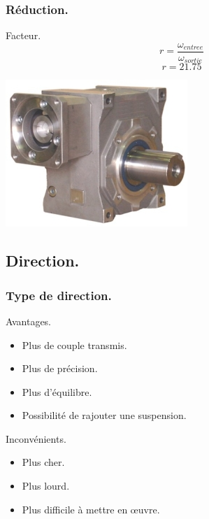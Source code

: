 \begin{frame}
    \frametitle{Réduction.}
    \begin{block}{Facteur.}
        \[ r = \frac{\omega_{entree}}{\omega_{sortie}} \]
        \[ r = 21.75 \]
    \end{block}
    \begin{center}
        \includegraphics[scale=0.9]{rcs/redu.png}
    \end{center}
\end{frame}

\subsection{Direction.}
\begin{frame}
    \frametitle{Type de direction.}
    \begin{exampleblock}{Avantages.}
        \begin{itemize}
            \item Plus de couple transmis.
            \item Plus de précision.
            \item Plus d'équilibre.
            \item Possibilité de rajouter une suspension.
        \end{itemize}
    \end{exampleblock}
     {
        \begin{alertblock}{Inconvénients.}
            \begin{itemize}
                \item Plus cher.
                \item Plus lourd.
                \item Plus difficile à mettre en œuvre.
            \end{itemize}
        \end{alertblock}
    }
\end{frame}


